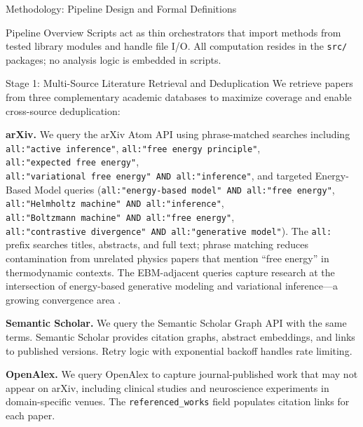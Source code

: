 \documentclass[
  ignorenonframetext,
]{beamer}
\begin{document}
\begin{frame}[fragile]{Methodology: Pipeline Design and Formal
Definitions}
\begin{block}{Pipeline Overview}
Scripts act as thin orchestrators that import methods from tested
library modules and handle file I/O. All computation resides in the
\texttt{src/} packages; no analysis logic is embedded in scripts.
\end{block}

\begin{block}{Stage 1: Multi-Source Literature Retrieval and
Deduplication}
\protect{}\label{stage-1-multi-source-literature-retrieval-and-deduplication}
We retrieve papers from three complementary academic databases to
maximize coverage and enable cross-source deduplication:

\textbf{arXiv.} We query the arXiv Atom API using phrase-matched
searches including \texttt{all:"active\ inference"},
\texttt{all:"free\ energy\ principle"},
\texttt{all:"expected\ free\ energy"},
\texttt{all:"variational\ free\ energy"\ AND\ all:"inference"}, and
targeted Energy-Based Model queries
(\texttt{all:"energy-based\ model"\ AND\ all:"free\ energy"},
\texttt{all:"Helmholtz\ machine"\ AND\ all:"inference"},
\texttt{all:"Boltzmann\ machine"\ AND\ all:"free\ energy"},
\texttt{all:"contrastive\ divergence"\ AND\ all:"generative\ model"}).
The \texttt{all:} prefix searches titles, abstracts, and full text;
phrase matching reduces contamination from unrelated physics papers that
mention ``free energy'' in thermodynamic contexts. The EBM-adjacent
queries capture research at the intersection of energy-based generative
modeling and variational inference---a growing convergence area
\citep{lecun2006tutorial}.

\textbf{Semantic Scholar.} We query the Semantic Scholar Graph API
\citep{kinney2023semantic} with the same terms. Semantic Scholar
provides citation graphs, abstract embeddings, and links to published
versions. Retry logic with exponential backoff handles rate limiting.

\textbf{OpenAlex.} We query OpenAlex \citep{priem2022openalex} to
capture journal-published work that may not appear on arXiv, including
clinical studies and neuroscience experiments in domain-specific venues.
The \texttt{referenced\_works} field populates citation links for each
paper.


\end{block}
\end{frame}
\end{document}
